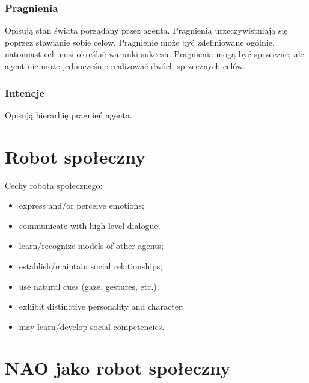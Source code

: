 \subsubsection{Pragnienia}
Opisują stan świata porządany przez agenta. 
Pragnienia urzeczywistniają się poprzez stawianie sobie celów. Pragnienie może być zdefiniowane ogólnie, natomiast cel musi określać warunki sukcesu. Pragnienia mogą być sprzeczne, ale agent nie może jednocześnie realizować dwóch sprzecznych celów.

\subsubsection{Intencje}
Opisują hierarhię pragnień agenta. 





\section{Robot społeczny}
Cechy robota społecznego:
\begin{itemize}
    \item express and/or perceive emotions;
    \item communicate with high-level dialogue;
    \item learn/recognize models of other agents;
    \item establish/maintain social relationships;
    \item use natural cues (gaze, gestures, etc.);
    \item exhibit distinctive personality and character;
    \item may learn/develop social competencies.
\end{itemize}


\section{NAO jako robot społeczny}
